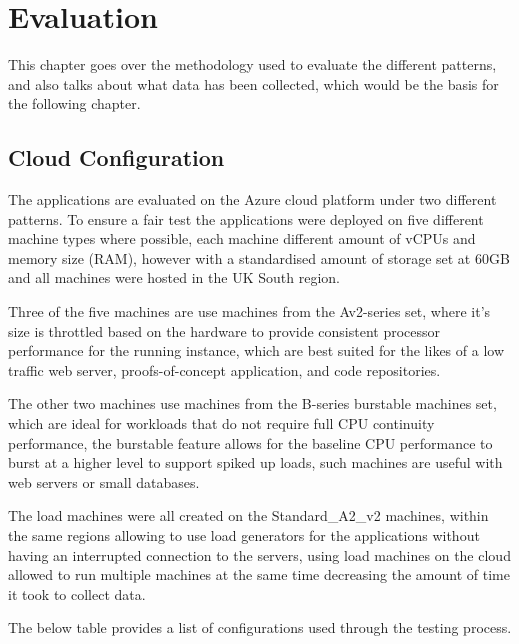 \chapter{Evaluation} 
This chapter goes over the methodology used to evaluate the different patterns, and also talks about what data has been collected, which would be the basis for the following chapter. 

\section{Cloud Configuration}
The applications are evaluated on the Azure cloud platform under two different patterns. To ensure a fair test the applications were deployed on five different machine types where possible, each machine different amount of vCPUs and memory size (RAM), however with a standardised amount of storage set at 60GB and all machines were hosted in the UK South region. 

Three of the five machines are use machines from the Av2-series set, where it's size is throttled based on the hardware to provide consistent processor performance for the running instance, which are best suited for the likes of a low traffic web server, proofs-of-concept application, and code repositories.

The other two machines use machines from the B-series burstable machines set, which are ideal for workloads that do not require full CPU continuity performance, the burstable feature allows for the baseline CPU performance to burst at a higher level to support spiked up loads,  such machines are useful with web servers or small databases. 

The load machines were all created on the Standard\_A2\_v2 machines, within the same regions allowing to use load generators for the applications without having an interrupted connection to the servers, using load machines on the cloud allowed to run multiple machines at the same time decreasing the amount of time it took to collect data. 

The below table provides a list of configurations used through the testing process.  

